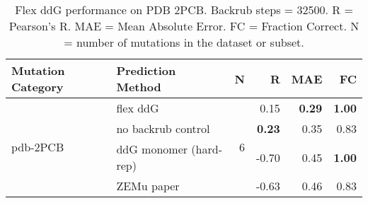 \begin{table}
  \begin{tabular}{llrrrr}
\toprule
Mutation Category &       Prediction Method &  N &     R &  MAE &   FC \\
\midrule
 \multirow{ 4}{*}{pdb-2PCB} & flex ddG & \multirow{ 4}{*}{6} & 0.15 & \textbf{0.29} & \textbf{1.00}  \\
 & no backrub control & & \textbf{0.23} & 0.35 & 0.83  \\
 & ddG monomer (hard-rep) & & -0.70 & 0.45 & \textbf{1.00}  \\
 & ZEMu paper & & -0.63 & 0.46 & 0.83  \\
\bottomrule
\end{tabular}
  \caption[Flex ddG performance on PDB 2PCB]{
    Flex ddG performance on PDB 2PCB. Backrub steps = 32500. R = Pearson's R. MAE = Mean Absolute Error. FC = Fraction Correct. N = number of mutations in the dataset or subset.
  } \label{tab:table-pdb-2PCB}
\end{table}
